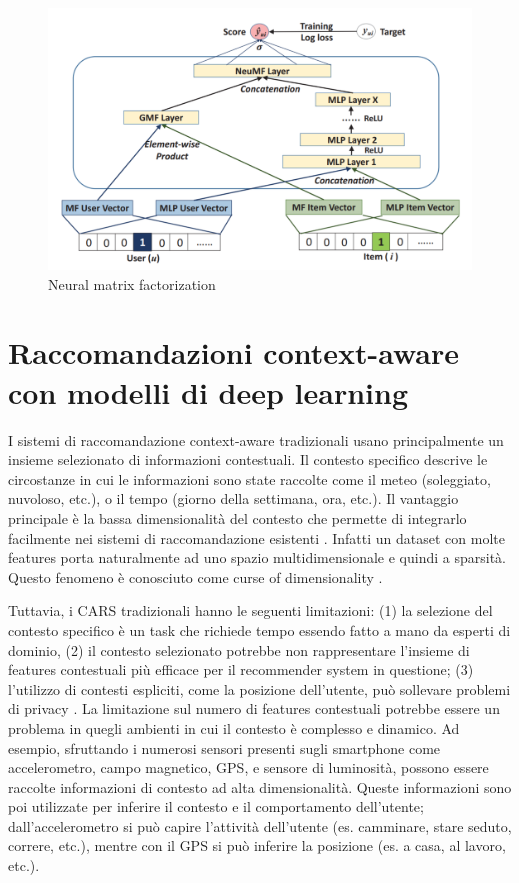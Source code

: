 \documentclass[12pt,italian]{report}
\begin{document}
\begin{figure}
  \includegraphics[width=\linewidth]{immagini/neumf.png}
  \caption{Neural matrix factorization}
  \label{fig:neumf}
\end{figure}

\section{Raccomandazioni context-aware con modelli di deep learning}
I sistemi di raccomandazione context-aware tradizionali usano principalmente un insieme selezionato di informazioni contestuali. Il contesto specifico descrive le circostanze in cui le informazioni sono state raccolte come il meteo (soleggiato, nuvoloso, etc.), o il tempo (giorno della settimana, ora, etc.). Il vantaggio principale è la bassa dimensionalità del contesto che permette di integrarlo facilmente nei sistemi di raccomandazione esistenti \cite{context-aware-deep-learning}. Infatti un dataset con molte features porta naturalmente ad uno spazio multidimensionale e quindi a sparsità. Questo fenomeno è conosciuto come curse of dimensionality \cite{curse-of-dim-CARS}.

Tuttavia, i CARS tradizionali hanno le seguenti limitazioni: (1) la selezione del contesto specifico è un task che richiede tempo essendo fatto a mano da esperti di dominio, (2) il contesto selezionato potrebbe non rappresentare l'insieme di features contestuali più efficace per il recommender system in questione; (3) l'utilizzo di contesti espliciti, come la posizione dell'utente, può sollevare problemi di privacy  \cite{context-aware-deep-learning}. La limitazione sul numero di features contestuali potrebbe essere un problema in quegli ambienti in cui il contesto è complesso e dinamico. Ad esempio, sfruttando i numerosi sensori presenti sugli smartphone come accelerometro, campo magnetico, GPS, e sensore di luminosità, possono essere raccolte informazioni di contesto ad alta dimensionalità. Queste informazioni sono poi utilizzate per inferire il contesto e il comportamento dell'utente; dall'accelerometro si può capire l'attività dell'utente (es. camminare, stare seduto, correre, etc.), mentre con il GPS si può inferire la posizione (es. a casa, al lavoro, etc.).
\end{document}
